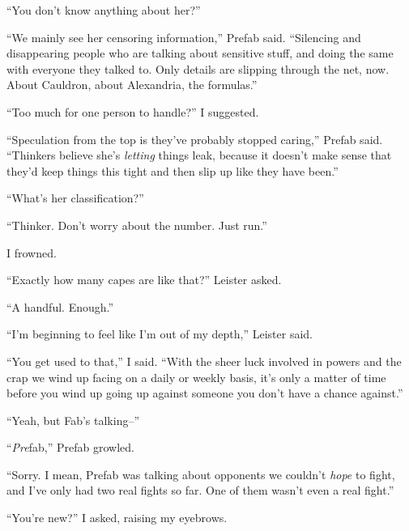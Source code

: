``You don't know anything about her?''



``We mainly see her censoring information,'' Prefab said.  ``Silencing and disappearing people who are talking about sensitive stuff, and doing the same with everyone they talked to.  Only details are slipping through the net, now.  About Cauldron, about Alexandria, the formulas.''



``Too much for one person to handle?'' I suggested.



``Speculation from the top is they've probably stopped caring,'' Prefab said.  ``Thinkers believe she's \emph{letting} things leak, because it doesn't make sense that they'd keep things this tight and then slip up like they have been.''



``What's her classification?''



``Thinker.  Don't worry about the number.  Just run.''



I frowned.



``Exactly how many capes are like that?'' Leister asked.



``A handful.  Enough.''



``I'm beginning to feel like I'm out of my depth,'' Leister said.



``You get used to that,'' I said.  ``With the sheer luck involved in powers and the crap we wind up facing on a daily or weekly basis, it's only a matter of time before you wind up going up against someone you don't have a chance against.''



``Yeah, but Fab's talking--''



``\emph{Pre}fab,'' Prefab growled.



``Sorry.  I mean, Prefab was talking about opponents we couldn't \emph{hope} to fight, and I've only had two real fights so far.  One of them wasn't even a real fight.''



``You're new?'' I asked, raising my eyebrows.



